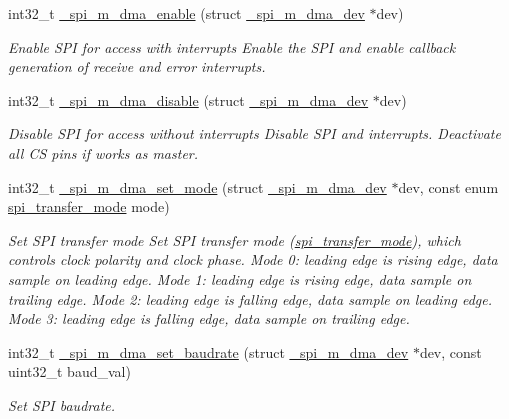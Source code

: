 \begin{DoxyCompactItemize}
int32\+\_\+t \hyperlink{group__hpl__spi_ga84487738869d6a3a349d71507e504946}{\+\_\+spi\+\_\+m\+\_\+dma\+\_\+enable} (struct \hyperlink{group__hpl__spi_ga63a73aeb4b9cc78590635e10bb0b1e8b}{\+\_\+spi\+\_\+m\+\_\+dma\+\_\+dev} $\ast$dev)
\begin{DoxyCompactList}\small\item\em Enable S\+PI for access with interrupts Enable the S\+PI and enable callback generation of receive and error interrupts. \end{DoxyCompactList}\item 
int32\+\_\+t \hyperlink{group__hpl__spi_ga4923cdd8808adfcff6286c3a22680773}{\+\_\+spi\+\_\+m\+\_\+dma\+\_\+disable} (struct \hyperlink{group__hpl__spi_ga63a73aeb4b9cc78590635e10bb0b1e8b}{\+\_\+spi\+\_\+m\+\_\+dma\+\_\+dev} $\ast$dev)
\begin{DoxyCompactList}\small\item\em Disable S\+PI for access without interrupts Disable S\+PI and interrupts. Deactivate all CS pins if works as master. \end{DoxyCompactList}\item 
int32\+\_\+t \hyperlink{group__hpl__spi_ga447e3d2a41c2332c652b906f4ec77b03}{\+\_\+spi\+\_\+m\+\_\+dma\+\_\+set\+\_\+mode} (struct \hyperlink{group__hpl__spi_ga63a73aeb4b9cc78590635e10bb0b1e8b}{\+\_\+spi\+\_\+m\+\_\+dma\+\_\+dev} $\ast$dev, const enum \hyperlink{group__hpl__spi_ga9c30fdfffba6be76b4044ccb17b218e5}{spi\+\_\+transfer\+\_\+mode} mode)
\begin{DoxyCompactList}\small\item\em Set S\+PI transfer mode Set S\+PI transfer mode (\hyperlink{group__hpl__spi_ga9c30fdfffba6be76b4044ccb17b218e5}{spi\+\_\+transfer\+\_\+mode}), which controls clock polarity and clock phase. Mode 0\+: leading edge is rising edge, data sample on leading edge. Mode 1\+: leading edge is rising edge, data sample on trailing edge. Mode 2\+: leading edge is falling edge, data sample on leading edge. Mode 3\+: leading edge is falling edge, data sample on trailing edge. \end{DoxyCompactList}\item 
int32\+\_\+t \hyperlink{group__hpl__spi_ga99577599f4159b1e739a34f3b485fb45}{\+\_\+spi\+\_\+m\+\_\+dma\+\_\+set\+\_\+baudrate} (struct \hyperlink{group__hpl__spi_ga63a73aeb4b9cc78590635e10bb0b1e8b}{\+\_\+spi\+\_\+m\+\_\+dma\+\_\+dev} $\ast$dev, const uint32\+\_\+t baud\+\_\+val)
\begin{DoxyCompactList}\small\item\em Set S\+PI baudrate. \end{DoxyCompactList}\item 

\end{DoxyCompactItemize}
